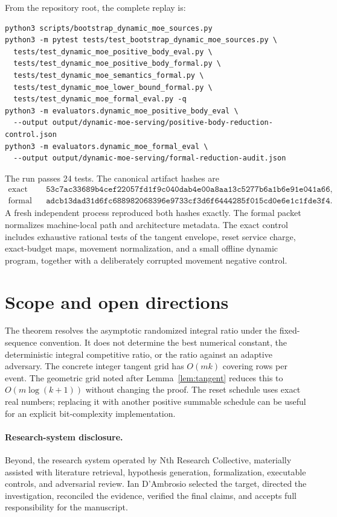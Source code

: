\documentclass[11pt]{article}
\theoremstyle{remark}
\begin{document}
From the repository root, the complete replay is:
\begin{verbatim}
python3 scripts/bootstrap_dynamic_moe_sources.py
python3 -m pytest tests/test_bootstrap_dynamic_moe_sources.py \
  tests/test_dynamic_moe_positive_body_eval.py \
  tests/test_dynamic_moe_positive_body_formal.py \
  tests/test_dynamic_moe_semantics_formal.py \
  tests/test_dynamic_moe_lower_bound_formal.py \
  tests/test_dynamic_moe_formal_eval.py -q
python3 -m evaluators.dynamic_moe_positive_body_eval \
  --output output/dynamic-moe-serving/positive-body-reduction-control.json
python3 -m evaluators.dynamic_moe_formal_eval \
  --output output/dynamic-moe-serving/formal-reduction-audit.json
\end{verbatim}
The run passes 24 tests.  The canonical artifact hashes are
\begin{align*}
\text{exact control: }&
\texttt{53c7ac33689b4cef22057fd1f9c040dab4e00a8aa13c5277b6a1b6e91e041a66},\\
\text{formal packet: }&
\texttt{adcb13dad31d6fc688982068396e9733cf3d6f6444285f015cd0e6e1c1fde3f4}.
\end{align*}
A fresh independent process reproduced both hashes exactly.  The formal packet
normalizes machine-local path and architecture metadata.  The exact control
includes exhaustive rational tests of the tangent envelope, reset service
charge, exact-budget maps, movement normalization, and a small offline dynamic
program, together with a deliberately corrupted movement negative control.

\section{Scope and open directions}

The theorem resolves the asymptotic randomized integral ratio under the
fixed-sequence convention.  It does not determine the best numerical constant,
the deterministic integral competitive ratio, or the ratio against an adaptive
adversary.  The concrete integer tangent grid has $O(mk)$ covering rows per
event.  The geometric grid noted after Lemma~\ref{lem:tangent} reduces this to
$O(m\log(k+1))$ without changing the proof.  The reset schedule uses exact real
numbers; replacing it with another positive summable schedule can be useful for
an explicit bit-complexity implementation.

\paragraph{Research-system disclosure.}
Beyond, the research system operated by Nth Research Collective, materially
assisted with literature retrieval, hypothesis generation, formalization,
executable controls, and adversarial review.  Ian D'Ambrosio selected the
target, directed the investigation, reconciled the evidence, verified the final
claims, and accepts full responsibility for the manuscript.
\end{document}
